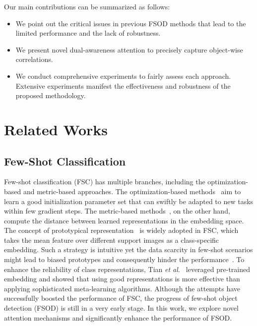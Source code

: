 \documentclass[journal]{IEEEtran}
\newcommand{\etal}{\textit{et al.}}
\begin{document}
Our main contributions can be summarized as follows:
\begin{itemize}
    \item We point out the critical issues in previous FSOD methods that lead to the limited performance and the lack of robustness.
    \item We present novel dual-awareness attention to precisely capture object-wise correlations.
\item We conduct comprehensive experiments to fairly assess each approach. Extensive experiments manifest the effectiveness and robustness of the proposed methodology.
\end{itemize}




\section{Related Works}

\subsection{Few-Shot Classification}
Few-shot classification (FSC) has multiple branches, including the optimization-based and metric-based approaches.
The optimization-based methods~\cite{ravi2016optimization, finn2017model, li2017meta, nichol2018first, lee2019meta} aim to learn a good initialization parameter set that can swiftly be adapted to new tasks within few gradient steps. 
The metric-based methods~\cite{koch2015siamese, vinyals2016matching, snell2017prototypical, sung2018learning, liu2019prototype, tian2020rethinking}, on the other hand, compute the distance between learned representations in the embedding space.
The concept of prototypical representation~\cite{snell2017prototypical} is widely adopted in FSC, which takes the mean feature over different support images as a class-specific embedding.
Such a strategy is intuitive yet the data scarcity in few-shot scenarios might lead to biased prototypes and consequently hinder the performance~\cite{liu2019prototype}.
To enhance the reliability of class representations, Tian \etal~\cite{tian2020rethinking} leveraged pre-trained embedding and showed that using good representations is more effective than applying sophisticated meta-learning algorithms.
Although the attempts have successfully boosted the performance of FSC, the progress of few-shot object detection (FSOD) is still in a very early stage.
In this work, we explore novel attention mechanisms and significantly enhance the performance of FSOD.
\end{document}
